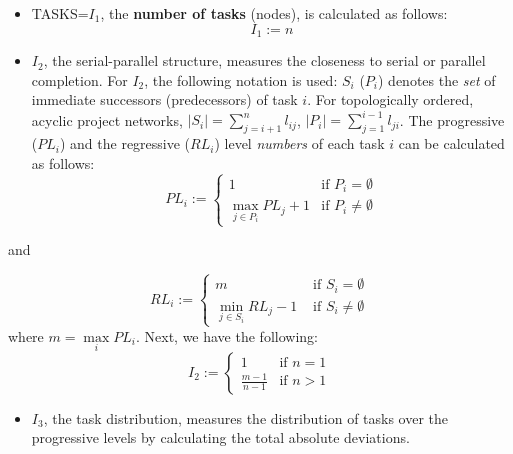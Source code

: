 \documentclass[preprint,
3p]{elsarticle} %
\providecommand{\tightlist}{%
  \setlength{\itemsep}{0pt}\setlength{\parskip}{0pt}}
\begin{document}
\begin{appendices}
\begin{itemize}
\item
  TASKS=\(I_1\), the \textbf{number of tasks} (nodes), is calculated as
  follows: \begin{equation}
  \label{eq:I1}
    I_1:=n
  \end{equation}
\item
  \(I_2\), the serial-parallel structure, measures the closeness to
  serial or parallel completion. For \(I_2\), the following notation is
  used: \(S_i\) (\(P_i\)) denotes the \emph{set} of immediate successors
  (predecessors) of task \(i\). For topologically ordered, acyclic
  project networks, \(|S_i|=\sum\limits_{j=i+1}^n l_{ij}\),
  \(|P_i|=\sum\limits_{j=1}^{i-1} l_{ji}\). The progressive (\(PL_i\))
  and the regressive (\(RL_i\)) level \emph{numbers} of each task \(i\)
  can be calculated as follows: \begin{equation}
   \label{eq:PLi}
   PL_i := \begin{cases} 
  1 & \text{if $P_i = \emptyset $} \\
  \max\limits_{j \in P_i} PL_j + 1 
  & \text{if $P_i \neq \emptyset $} 
  \end{cases} 
  \end{equation}
\end{itemize}

\noindent  and

\begin{equation}
\label{eq:RLi}
RL_i := \begin{cases} m & \text{ if }S_i = \emptyset \\
\min\limits_{j \in S_i} RL_j - 1 & \text{ if } S_i \neq 
\emptyset 
\end{cases}
\end{equation} \noindent  where \(m=\max\limits_{i} PL_i\). Next, we
have the following: \begin{equation}
\label{eq:I2}
    I_2:=\begin{cases} 1 & \text{if $n = 1$} \\ \frac{m-1}{n-1} & \text{if $n > 1$}\end{cases}
\end{equation}

\begin{itemize}
\tightlist
\item
  \(I_3\), the task distribution, measures the distribution of tasks
  over the progressive levels by calculating the total absolute
  deviations.
\end{itemize}


\end{appendices}
\end{document}
